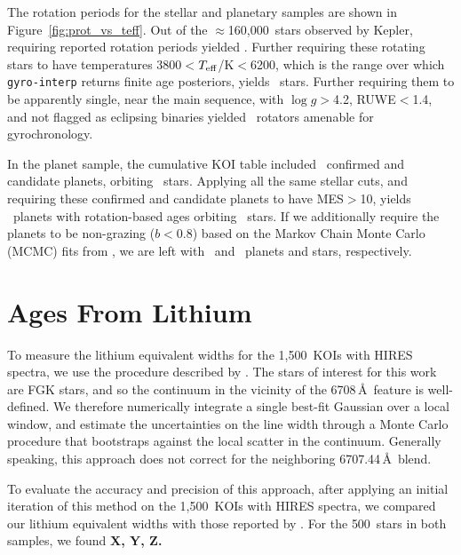 \documentclass[11pt,twocolumn,tighten]{aastex63}
\newcommand{\nkeplerstars}{$\approx$160{,}000}
\newcommand{\nkoiswithhires}{{1{,}500}}
\newcommand{\nbergeroverlap}{{500}}
\begin{document}
The rotation periods for the stellar and planetary samples are shown
in Figure~\ref{fig:prot_vs_teff}.  Out of the \nkeplerstars\ stars
observed by Kepler, requiring reported rotation periods yielded
\nuniqstarsantosrotgyroappl.  Further requiring these rotating stars
to have temperatures 3800$<$$T_{\rm eff}$/K$<$6200, which is the range
over which \texttt{gyro-interp} returns finite age posteriors,
yields \nuniqstarsantosrotteffcut\ stars.
Further requiring them to be apparently single, near the main
sequence, with $\log g$$>$4.2, RUWE$<$1.4, and not flagged as
eclipsing binaries yielded \nuniqstarsantosrotgyroappl\ rotators
amenable for gyrochronology.

In the planet sample, the cumulative KOI table included
\nnonfpcumkois\ confirmed and candidate planets, orbiting
\nnonfpcumkoihosts\ stars.  Applying all the same stellar cuts, and
requiring these confirmed and candidate planets to have MES$>$10,
yields \nplwgyroage\ planets with rotation-based ages orbiting
\nplhoststarwgyroage\ stars.  If we additionally require the planets
to be non-grazing ($b<0.8$) based on the Markov Chain Monte Carlo
(MCMC) fits from \citet{Thompson_2018}, we are left with
\nplwgyroagenograzing\ and \nplhoststarwgyroagenograzing\ planets and
stars, respectively.




\section{Ages From Lithium}
\label{sec:liage}

To measure the lithium equivalent widths for the \nkoiswithhires\ KOIs
with HIRES spectra, we use the procedure described by
\citet{Bouma_2021}.
The stars of interest for this work are FGK stars, and so the
continuum in the vicinity of the
 6708\,\AA\ feature is well-defined.
We therefore numerically integrate a single best-fit Gaussian over a
local window, and estimate the uncertainties on the line width through
a Monte Carlo procedure that bootstraps against the local scatter in the
continuum.
Generally speaking, this approach does not correct for the neighboring
 6707.44\,\AA\ blend.

To evaluate the accuracy and precision of this approach, after
applying an initial iteration of this method on the \nkoiswithhires\
KOIs with HIRES spectra, we compared our lithium equivalent widths
with those reported by \citet{Berger_2018}.
For the \nbergeroverlap\ stars in both samples, 
we found {\bf X, Y, Z.}
\end{document}
